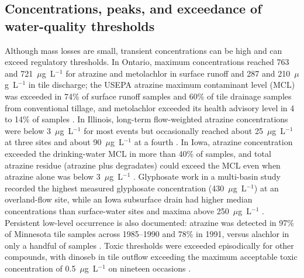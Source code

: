 \subsection{Concentrations, peaks, and exceedance of water-quality thresholds}
Although mass losses are small, transient concentrations can be high and can exceed regulatory thresholds. In Ontario, maximum concentrations reached 763 and 721~$\mu$g~L$^{-1}$ for atrazine and metolachlor in surface runoff and 287 and 210~$\mu$g~L$^{-1}$ in tile discharge; the USEPA atrazine maximum contaminant level (MCL) was exceeded in 74\% of surface runoff samples and 60\% of tile drainage samples from conventional tillage, and metolachlor exceeded its health advisory level in 4 to 14\% of samples \parencite{GAYNOR1995}. In Illinois, long-term flow-weighted atrazine concentrations were below 3~$\mu$g~L$^{-1}$ for most events but occasionally reached about 25~$\mu$g~L$^{-1}$ at three sites and about 90~$\mu$g~L$^{-1}$ at a fourth \parencite{Kalita2006}. In Iowa, atrazine concentration exceeded the drinking-water MCL in more than 40\% of samples, and total atrazine residue (atrazine plus degradates) could exceed the MCL even when atrazine alone was below 3~$\mu$g~L$^{-1}$ \parencite{JAYACHANDRAN1994}. Glyphosate work in a multi-basin study recorded the highest measured glyphosate concentration (430~$\mu$g~L$^{-1}$) at an overland-flow site, while an Iowa subsurface drain had higher median concentrations than surface-water sites and maxima above 250~$\mu$g~L$^{-1}$ \parencite{Coupe2012}. Persistent low-level occurrence is also documented: atrazine was detected in 97\% of Minnesota tile samples across 1985--1990 and 78\% in 1991, versus alachlor in only a handful of samples \parencite{BUHLER1993}. Toxic thresholds were exceeded episodically for other compounds, with dinoseb in tile outflow exceeding the maximum acceptable toxic concentration of 0.5~$\mu$g~L$^{-1}$ on nineteen occasions \parencite{ONEILL1989}.

